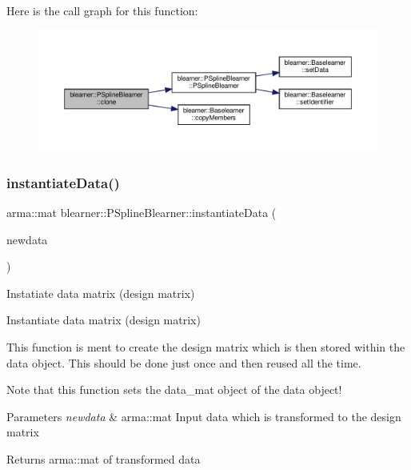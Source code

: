 Here is the call graph for this function\+:\nopagebreak
\begin{figure}[H]
\begin{center}
\leavevmode
\includegraphics[width=350pt]{classblearner_1_1_p_spline_blearner_a6fca532d2d20dfa284acc474ee1d7531_cgraph}
\end{center}
\end{figure}
\mbox{\label{classblearner_1_1_p_spline_blearner_ac0604daac451678e67a6a2ac60dd1b01}} 
\subsubsection{\texorpdfstring{instantiate\+Data()}{instantiateData()}}
{\footnotesize\ttfamily arma\+::mat blearner\+::\+P\+Spline\+Blearner\+::instantiate\+Data (\begin{DoxyParamCaption}\item[{const arma\+::mat \&}]{newdata }\end{DoxyParamCaption})\hspace{0.3cm}{\ttfamily [virtual]}}



Instatiate data matrix (design matrix) 

Instantiate data matrix (design matrix)

This function is ment to create the design matrix which is then stored within the data object. This should be done just once and then reused all the time.

Note that this function sets the {\ttfamily data\+\_\+mat} object of the data object!


\begin{DoxyParams}{Parameters}
{\em newdata} & {\ttfamily arma\+::mat} Input data which is transformed to the design matrix\\
\hline
\end{DoxyParams}
\begin{DoxyReturn}{Returns}
{\ttfamily arma\+::mat} of transformed data 
\end{DoxyReturn}


